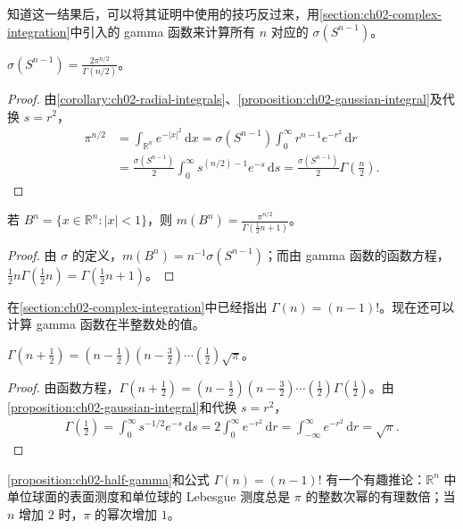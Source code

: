 \documentclass[../../main.tex]{subfiles}%
\begin{document}
知道这一结果后，可以将其证明中使用的技巧反过来，用\cref{section:ch02-complex-integration}中引入的 gamma 函数来计算所有 $n$ 对应的 $\sigma(S^{n-1})$。
\begin{proposition}\label{proposition:ch02-sphere-area}
$\displaystyle\sigma(S^{n-1})=\frac{2\pi^{n/2}}{\Gamma(n/2)}$。
\end{proposition}
\begin{proof}
由\cref{corollary:ch02-radial-integrals}、\cref{proposition:ch02-gaussian-integral}及代换 $s=r^2$，
\begin{align*}
\pi^{n/2}&=\int_{\mathbb{R}^n}e^{-|x|^2}\,\mathrm{d}x
=\sigma(S^{n-1})\int_0^\infty r^{n-1}e^{-r^2}\,\mathrm{d}r\\
&=\frac{\sigma(S^{n-1})}{2}\int_0^\infty s^{(n/2)-1}e^{-s}\,\mathrm{d}s
=\frac{\sigma(S^{n-1})}{2}\Gamma\left(\frac n2\right).
\end{align*}
\end{proof}
\begin{corollary}\label{corollary:ch02-unit-ball-volume}
若 $B^n=\{x\in\mathbb{R}^n:|x|<1\}$，则 $\displaystyle m(B^n)=\frac{\pi^{n/2}}{\Gamma(\frac12n+1)}$。
\end{corollary}
\begin{proof}
由 $\sigma$ 的定义，$m(B^n)=n^{-1}\sigma(S^{n-1})$；而由 gamma 函数的函数方程，$\frac12n\Gamma(\frac12n)=\Gamma(\frac12n+1)$。
\end{proof}
在\cref{section:ch02-complex-integration}中已经指出 $\Gamma(n)=(n-1)!$。现在还可以计算 gamma 函数在半整数处的值。
\begin{proposition}\label{proposition:ch02-half-gamma}
$\Gamma(n+\frac12)=(n-\frac12)(n-\frac32)\cdots(\frac12)\sqrt\pi$。
\end{proposition}
\begin{proof}
由函数方程，$\Gamma(n+\frac12)=(n-\frac12)(n-\frac32)\cdots(\frac12)\Gamma(\frac12)$。由\cref{proposition:ch02-gaussian-integral}和代换 $s=r^2$，
\begin{align*}
\Gamma\left(\tfrac12\right)=\int_0^\infty s^{-1/2}e^{-s}\,\mathrm{d}s
=2\int_0^\infty e^{-r^2}\,\mathrm{d}r
=\int_{-\infty}^\infty e^{-r^2}\,\mathrm{d}r=\sqrt\pi.
\end{align*}
\end{proof}
\begin{remark}
\cref{proposition:ch02-half-gamma}和公式 $\Gamma(n)=(n-1)!$ 有一个有趣推论：$\mathbb{R}^n$ 中单位球面的表面测度和单位球的 Lebesgue 测度总是 $\pi$ 的整数次幂的有理数倍；当 $n$ 增加 $2$ 时，$\pi$ 的幂次增加 $1$。
\end{remark}
\end{document}
